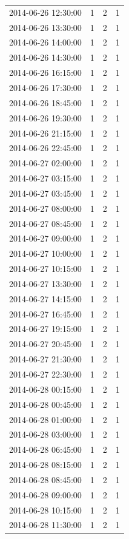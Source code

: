 \begin{tabular}{lrrr}
2014-06-26 12:30:00 & 1 & 2 & 1 \\
2014-06-26 13:30:00 & 1 & 2 & 1 \\
2014-06-26 14:00:00 & 1 & 2 & 1 \\
2014-06-26 14:30:00 & 1 & 2 & 1 \\
2014-06-26 16:15:00 & 1 & 2 & 1 \\
2014-06-26 17:30:00 & 1 & 2 & 1 \\
2014-06-26 18:45:00 & 1 & 2 & 1 \\
2014-06-26 19:30:00 & 1 & 2 & 1 \\
2014-06-26 21:15:00 & 1 & 2 & 1 \\
2014-06-26 22:45:00 & 1 & 2 & 1 \\
2014-06-27 02:00:00 & 1 & 2 & 1 \\
2014-06-27 03:15:00 & 1 & 2 & 1 \\
2014-06-27 03:45:00 & 1 & 2 & 1 \\
2014-06-27 08:00:00 & 1 & 2 & 1 \\
2014-06-27 08:45:00 & 1 & 2 & 1 \\
2014-06-27 09:00:00 & 1 & 2 & 1 \\
2014-06-27 10:00:00 & 1 & 2 & 1 \\
2014-06-27 10:15:00 & 1 & 2 & 1 \\
2014-06-27 13:30:00 & 1 & 2 & 1 \\
2014-06-27 14:15:00 & 1 & 2 & 1 \\
2014-06-27 16:45:00 & 1 & 2 & 1 \\
2014-06-27 19:15:00 & 1 & 2 & 1 \\
2014-06-27 20:45:00 & 1 & 2 & 1 \\
2014-06-27 21:30:00 & 1 & 2 & 1 \\
2014-06-27 22:30:00 & 1 & 2 & 1 \\
2014-06-28 00:15:00 & 1 & 2 & 1 \\
2014-06-28 00:45:00 & 1 & 2 & 1 \\
2014-06-28 01:00:00 & 1 & 2 & 1 \\
2014-06-28 03:00:00 & 1 & 2 & 1 \\
2014-06-28 06:45:00 & 1 & 2 & 1 \\
2014-06-28 08:15:00 & 1 & 2 & 1 \\
2014-06-28 08:45:00 & 1 & 2 & 1 \\
2014-06-28 09:00:00 & 1 & 2 & 1 \\
2014-06-28 10:15:00 & 1 & 2 & 1 \\
2014-06-28 11:30:00 & 1 & 2 & 1 \\

\end{tabular}
